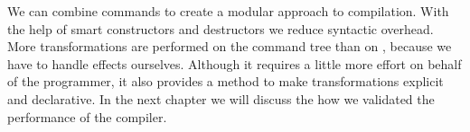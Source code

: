 We can combine commands to create a modular approach to compilation. With the help of smart constructors and destructors we reduce syntactic overhead. More transformations are performed on the command tree than on , because we have to handle effects ourselves. Although it requires a little more effort on behalf of the programmer, it also provides a method to make transformations explicit and declarative. In the next chapter we will discuss the how we validated the performance of the compiler.
